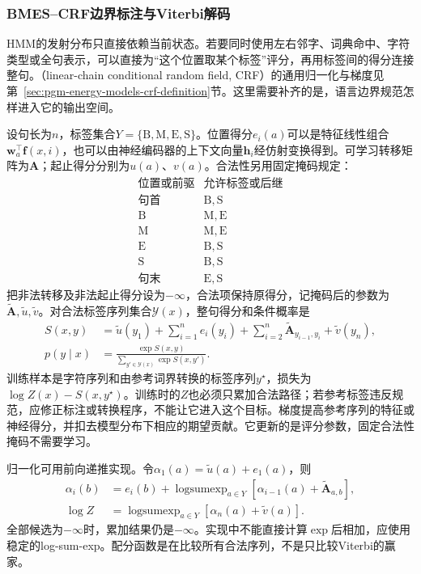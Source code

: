 \subsubsection{BMES--CRF边界标注与Viterbi解码}
\label{sec:nlp-analysis-bmes-crf}

HMM的发射分布只直接依赖当前状态。若要同时使用左右邻字、词典命中、字符类型或全句表示，可以直接为“这个位置取某个标签”评分，再用标签间的得分连接整句。（linear-chain conditional random field, CRF）的通用归一化与梯度见第~\ref{sec:pgm-energy-models-crf-definition}节。这里需要补齐的是，语言边界规范怎样进入它的输出空间。

设句长为$n$，标签集合$Y=\{\mathrm{B,M,E,S}\}$。位置得分$e_i(a)$可以是特征线性组合$\bm{w}_a^\top\bm{f}(x,i)$，也可以由神经编码器的上下文向量$\bm{h}_i$经仿射变换得到。可学习转移矩阵为$\bm{A}$；起止得分分别为$u(a)$、$v(a)$。合法性另用固定掩码规定：
\[
\begin{array}{c|c}
 \text{位置或前驱}&\text{允许标签或后继}\\ \hline
 \text{句首}&\mathrm{B,S}\\
 \mathrm{B}&\mathrm{M,E}\\
 \mathrm{M}&\mathrm{M,E}\\
 \mathrm{E}&\mathrm{B,S}\\
 \mathrm{S}&\mathrm{B,S}\\
 \text{句末}&\mathrm{E,S}
\end{array}
\]
把非法转移及非法起止得分设为$-\infty$，合法项保持原得分，记掩码后的参数为$\widetilde{\bm{A}},\tilde u,\tilde v$。对合法标签序列集合$\mathcal{Y}(x)$，整句得分和条件概率是
\begin{align}
 S(x,y)&=\tilde u(y_1)+\sum_{i=1}^{n}e_i(y_i)
       +\sum_{i=2}^{n}\widetilde{\bm{A}}_{y_{i-1},y_i}
       +\tilde v(y_n),\label{eq:nlp-analysis-crf-score}\\
 p(y\mid x)&=\frac{\exp S(x,y)}
   {\sum_{y'\in\mathcal{Y}(x)}\exp S(x,y')}.\label{eq:nlp-analysis-crf-probability}
\end{align}
训练样本是字符序列和由参考词界转换的标签序列$y^\star$，损失为$\log Z(x)-S(x,y^\star)$。训练时的$Z$也必须只累加合法路径；若参考标签违反规范，应修正标注或转换程序，不能让它进入这个目标。梯度提高参考序列的特征或神经得分，并扣去模型分布下相应的期望贡献。它更新的是评分参数，固定合法性掩码不需要学习。

归一化可用前向递推实现。令$\alpha_1(a)=\tilde u(a)+e_1(a)$，则
\[
\begin{aligned}
 \alpha_i(b)&=e_i(b)+
 \operatorname{logsumexp}_{a\in Y}
       [\alpha_{i-1}(a)+\widetilde{\bm{A}}_{a,b}],\\
 \log Z&=\operatorname{logsumexp}_{a\in Y}
       [\alpha_n(a)+\tilde v(a)].
\end{aligned}
\]
全部候选为$-\infty$时，累加结果仍是$-\infty$。实现中不能直接计算$\exp$后相加，应使用稳定的log-sum-exp。配分函数是在比较所有合法序列，不是只比较Viterbi的赢家。

